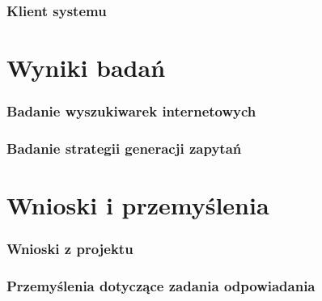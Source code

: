\documentclass{beamer}
\begin{document}
\begin{frame}
  \frametitle{Klient systemu} 
  \begin{figure}
    \centering
    \label{fig:klient-odp}
  \end{figure}
\end{frame}

\section{Wyniki badań}
\begin{frame}
  \frametitle{Badanie wyszukiwarek internetowych}

\end{frame}

\begin{frame}
  \frametitle{Badanie strategii generacji zapytań}

\end{frame}

\section{Wnioski i przemyślenia}
\begin{frame}
  \frametitle{Wnioski z projektu}

\end{frame}

\begin{frame}
  \frametitle{Przemyślenia dotyczące zadania odpowiadania}

\end{frame}
\end{document}
